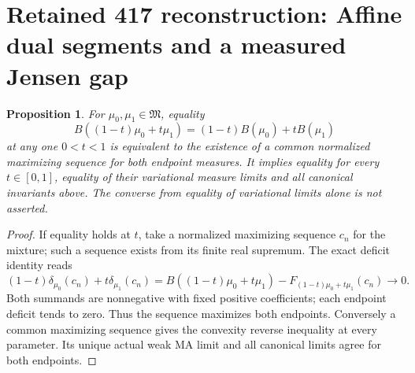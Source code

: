 \documentclass[11pt]{article}
\newtheorem{proposition}[theorem]{Proposition}
\newcommand{\M}{\mathfrak M}
\begin{document}
\section{Retained 417 reconstruction: Affine dual segments and a measured Jensen gap}
\begin{proposition}\label{ret417:affine}
For $\mu_0,\mu_1\in\M$, equality
\[
 B((1-t)\mu_0+t\mu_1)=(1-t)B(\mu_0)+tB(\mu_1)
\]
at any one $0<t<1$ is equivalent to the existence of a common
normalized maximizing sequence for both endpoint measures.
It implies equality for every $t\in[0,1]$, equality of their
variational measure limits and all canonical invariants above.
The converse from equality of variational limits alone is not asserted.
\end{proposition}
\begin{proof}
If equality holds at $t$, take a normalized maximizing sequence $c_n$
for the mixture; such a sequence exists from its finite real supremum.
The exact deficit identity reads
\[
 (1-t)\delta_{\mu_0}(c_n)+t\delta_{\mu_1}(c_n)
 =B((1-t)\mu_0+t\mu_1)-F_{(1-t)\mu_0+t\mu_1}(c_n)\to0.
\]
Both summands are nonnegative with fixed positive coefficients;
each endpoint deficit tends to zero. Thus the sequence maximizes
both endpoints. Conversely a common maximizing sequence gives the
convexity reverse inequality at every parameter. Its unique actual
weak MA limit and all canonical limits agree for both endpoints.
\end{proof}
\end{document}
